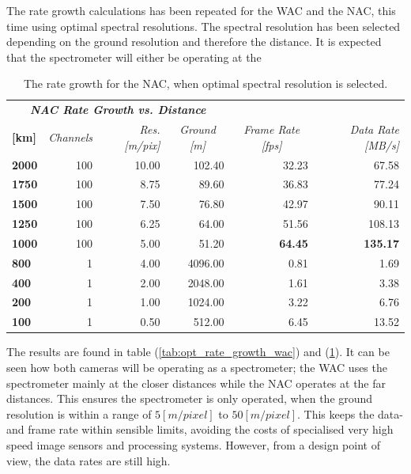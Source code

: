  The rate growth calculations has been repeated for the WAC and the NAC, this time using optimal spectral resolutions. The spectral resolution has been selected depending on the ground resolution and therefore the distance. It is expected that the spectrometer will either be operating at the 
\begin{table}[h!]
  \centering
    \begin{tabular}{l|r|r|r|r|r|}
\multicolumn{4}{c|}{\textit{\textbf{NAC Rate Growth vs. Distance}}} & \multicolumn{1}{r}{} & \multicolumn{1}{r}{} \bigstrut[b]\\
\cline{1-4}\textbf{[km]} & \textit{Channels} & \textit{Res. [m/pix]} & \multicolumn{1}{c|}{\textit{Ground [m]}} & \multicolumn{1}{c}{\textit{Frame Rate [fps]}} & \multicolumn{1}{r}{\textit{Data Rate [MB/s]}} \bigstrut\\
\hline
\textbf{2000} & 100   & 10.00 & 102.40 & 32.23 & 67.58 \bigstrut[t]\\
\textbf{1750} & 100   & 8.75  & 89.60 & 36.83 & 77.24 \\
\textbf{1500} & 100   & 7.50  & 76.80 & 42.97 & 90.11 \\
\textbf{1250} & 100   & 6.25  & 64.00 & 51.56 & 108.13 \\
\textbf{1000} & 100   & 5.00  & 51.20 & \textbf{64.45} & \textbf{135.17} \\
\textbf{800} & 1     & 4.00  & 4096.00 & 0.81  & 1.69 \\
\textbf{400} & 1     & 2.00  & 2048.00 & 1.61  & 3.38 \\
\textbf{200} & 1     & 1.00  & 1024.00 & 3.22  & 6.76 \\
\textbf{100} & 1     & 0.50  & 512.00 & 6.45  & 13.52 \\
\end{tabular}%
  \caption{The rate growth for the NAC, when optimal spectral resolution is selected.}
  \label{tab:opt_rate_growth_nac}%
\end{table}%
The results are found in table (\ref{tab:opt_rate_growth_wac}) and (\ref{tab:opt_rate_growth_nac}). It can be seen how both cameras will be operating as a spectrometer; the WAC uses the spectrometer mainly at the closer distances while the NAC operates at the far distances. This ensures the spectrometer is only operated, when the ground resolution is within a range of $5[m/pixel]$ to $50[m/pixel]$. This keeps the data- and frame rate within sensible limits, avoiding the costs of specialised very high speed image sensors and processing systems. However, from a design point of view, the data rates are still high. 

